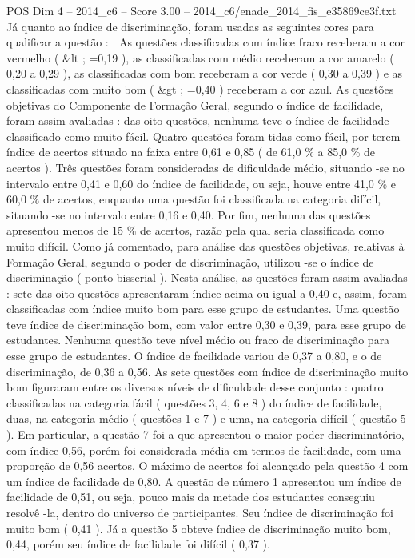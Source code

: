 \begin{textsample}{POS Dim 4 – 2014\_c6 – Score 3.00 – 2014\_c6/enade\_2014\_fis\_e35869ce3f.txt}
Já quanto ao índice de discriminação, foram usadas as seguintes cores para qualificar a questão :  As questões classificadas com índice fraco receberam a cor vermelho ( \&lt ; =0,19 ), as classificadas com médio receberam a cor amarelo ( 0,20 a 0,29 ), as classificadas com bom receberam a cor verde ( 0,30 a 0,39 ) e as classificadas com muito bom ( \&gt ; =0,40 ) receberam a cor azul.
As questões objetivas do Componente de Formação Geral, segundo o índice de facilidade, foram assim avaliadas : das oito questões, nenhuma teve o índice de facilidade classificado como muito fácil.
Quatro questões foram tidas como fácil, por terem índice de acertos situado na faixa entre 0,61 e 0,85 ( de 61,0 \% a 85,0 \% de acertos ).
Três questões foram consideradas de dificuldade médio, situando -se no intervalo entre 0,41 e 0,60 do índice de facilidade, ou seja, houve entre 41,0 \% e 60,0 \% de acertos, enquanto uma questão foi classificada na categoria difícil, situando -se no intervalo entre 0,16 e 0,40.
Por fim, nenhuma das questões apresentou menos de 15 \% de acertos, razão pela qual seria classificada como muito difícil.
Como já comentado, para análise das questões objetivas, relativas à Formação Geral, segundo o poder de discriminação, utilizou -se o índice de discriminação ( ponto bisserial ).
Nesta análise, as questões foram assim avaliadas : sete das oito questões apresentaram índice acima ou igual a 0,40 e, assim, foram classificadas com índice muito bom para esse grupo de estudantes.
Uma questão teve índice de discriminação bom, com valor entre 0,30 e 0,39, para esse grupo de estudantes.
Nenhuma questão teve nível médio ou fraco de discriminação para esse grupo de estudantes.
O índice de facilidade variou de 0,37 a 0,80, e o de discriminação, de 0,36 a 0,56.
As sete questões com índice de discriminação muito bom figuraram entre os diversos níveis de dificuldade desse conjunto : quatro classificadas na categoria fácil ( questões 3, 4, 6 e 8 ) do índice de facilidade, duas, na categoria médio ( questões 1 e 7 ) e uma, na categoria difícil ( questão 5 ).
Em particular, a questão 7 foi a que apresentou o maior poder discriminatório, com índice 0,56, porém foi considerada média em termos de facilidade, com uma proporção de 0,56 acertos.
O máximo de acertos foi alcançado pela questão 4 com um índice de facilidade de 0,80.
A questão de número 1 apresentou um índice de facilidade de 0,51, ou seja, pouco mais da metade dos estudantes conseguiu resolvê -la, dentro do universo de participantes.
Seu índice de discriminação foi muito bom ( 0,41 ).
Já a questão 5 obteve índice de discriminação muito bom, 0,44, porém seu índice de facilidade foi difícil ( 0,37 ).

\end{textsample}

